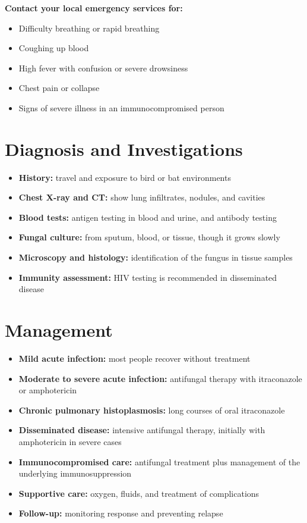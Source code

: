 \textbf{Contact your local emergency services for:}
\begin{itemize}
    \item Difficulty breathing or rapid breathing
    \item Coughing up blood
    \item High fever with confusion or severe drowsiness
    \item Chest pain or collapse
    \item Signs of severe illness in an immunocompromised person
\end{itemize}

\section*{Diagnosis and Investigations}
\begin{itemize}
    \item \textbf{History:} travel and exposure to bird or bat environments
    \item \textbf{Chest X-ray and CT:} show lung infiltrates, nodules, and cavities
    \item \textbf{Blood tests:} antigen testing in blood and urine, and antibody testing
    \item \textbf{Fungal culture:} from sputum, blood, or tissue, though it grows slowly
    \item \textbf{Microscopy and histology:} identification of the fungus in tissue samples
    \item \textbf{Immunity assessment:} HIV testing is recommended in disseminated disease
\end{itemize}

\section*{Management}
\begin{itemize}
    \item \textbf{Mild acute infection:} most people recover without treatment
    \item \textbf{Moderate to severe acute infection:} antifungal therapy with itraconazole or amphotericin
    \item \textbf{Chronic pulmonary histoplasmosis:} long courses of oral itraconazole
    \item \textbf{Disseminated disease:} intensive antifungal therapy, initially with amphotericin in severe cases
    \item \textbf{Immunocompromised care:} antifungal treatment plus management of the underlying immunosuppression
    \item \textbf{Supportive care:} oxygen, fluids, and treatment of complications
    \item \textbf{Follow-up:} monitoring response and preventing relapse
\end{itemize}

